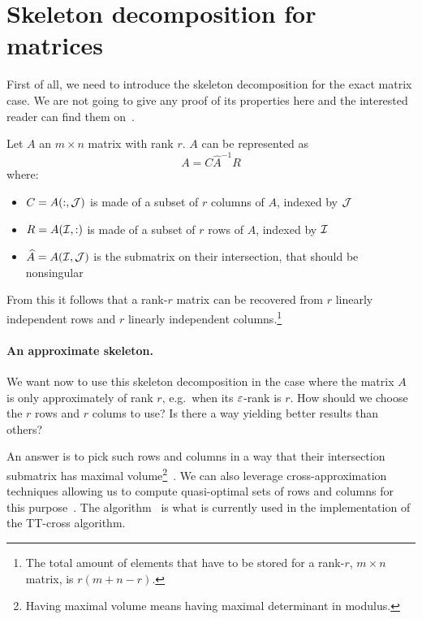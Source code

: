 \section{Skeleton decomposition for matrices}
First of all, we need to introduce the skeleton decomposition for the exact matrix case. We are not going to give any proof of its properties here and the interested reader can find them on~\cite{goreinov1997theory,gantmacher1959matrix}.

\begin{Teo}
  Let $A$ an $m \times n$ matrix with rank $r$. $A$ can be represented as
  \begin{equation} \label{def:skeleton}
    A = C \hat{A}^{-1} R
  \end{equation}
  where:
  \begin{itemize}
  \item $C = A(:,\mathcal{J})$ is made of a subset of $r$ columns of $A$, indexed by $\mathcal{J}$
  \item $R = A(\mathcal{I},:)$ is made of a subset of $r$ rows of $A$, indexed by $\mathcal{I}$
  \item $\widehat{A} = A(\mathcal{I},\mathcal{J})$ is the submatrix on their intersection, that should be nonsingular
  \end{itemize}
\end{Teo}

From this it follows that a rank-$r$ matrix can be recovered from $r$ linearly independent rows and $r$ linearly independent columns.\footnote{The total amount of elements that have to be stored for a rank-$r$, $m \times n$ matrix, is $r(m+n-r)$.}

\paragraph{An approximate skeleton.}
We want now to use this skeleton decomposition in the case where the matrix $A$ is only approximately of rank $r$, e.g.\ when its $\varepsilon$-rank is $r$.
How should we choose the $r$ rows and $r$ colums to use? Is there a way yielding better results than others?

An answer is to pick such rows and columns in a way that their intersection submatrix has maximal volume\footnote{Having maximal volume means having maximal determinant in modulus.}~\cite{goreinov2001maximal}. We can also leverage cross-approximation techniques allowing us to compute quasi-optimal sets of rows and columns for this purpose~\cite{tyrtyshnikov2000incomplete,bebendorf2000approximation}. The  algorithm~\cite{goreinov2010find} is what is currently used in the implementation of the TT-cross algorithm.

